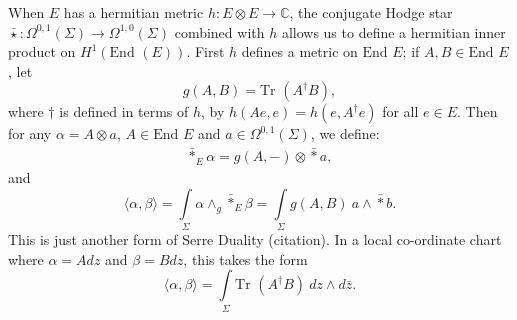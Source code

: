 \documentclass[]{article}
\newcommand{\C}{\mathbb{C}}
\newcommand{\End}{\text{End }}
\newcommand{\Tr}{\text{Tr }}
\begin{document}
	When $E$ has a hermitian metric $h:E\otimes E \to \C$, the conjugate Hodge star $\bar{\star}:\Omega^{0,1}(\Sigma) \to \Omega^{1,0}(\Sigma)$ combined with $h$ allows us to define a hermitian inner product on $H^1(\End (E))$.  First $h$ defines a metric on $\End E$; if $A,B\in \End E$, let
	\begin{equation}
		g(A,B) = \Tr(A^\dagger B),
	\end{equation}
	where $\dagger$ is defined in terms of $h$, by $h(Ae,e) = h(e,A^\dagger e)$ for all $e\in E$. Then for any $\alpha = A \otimes a$, $A\in \End E$ and $a \in \Omega^{0,1}(\Sigma)$, we define:
	\begin{align}
		\bar{\ast}_E \alpha = g(A,-)\otimes \bar{\ast}a, 
	\end{align}
	and
	\begin{equation}
		\langle \alpha, \beta \rangle = \int\limits_\Sigma \alpha \wedge_g \bar{\ast}_E \beta =\int\limits_\Sigma g(A,B)~a\wedge \bar{\ast} b.
	\end{equation}
	This is just another form of Serre Duality (citation). In a local co-ordinate chart where $\alpha = Adz$ and $\beta = Bdz$, this takes the form
	\begin{equation}
		\langle \alpha, \beta \rangle = \int\limits_\Sigma \Tr(A^\dagger B)~dz\wedge d\bar{z}.
	\end{equation}
\end{document}
